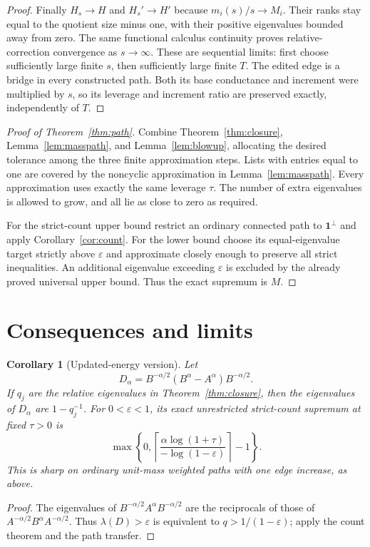 \documentclass[11pt]{article}
\newtheorem{corollary}[theorem]{Corollary}
\begin{document}
\begin{proof}
Finally $H_s\to H$ and $H_s'\to H'$ because $m_i(s)/s\to M_i$.
Their ranks stay equal to the quotient size minus one, with their
positive eigenvalues bounded away from zero. The same functional
calculus continuity proves relative-correction convergence as
$s\to\infty$. These are sequential limits: first choose sufficiently
large finite $s$, then sufficiently large finite $T$.
The edited edge is a bridge in every constructed path. Both its base
conductance and increment were multiplied by $s$, so its leverage
and increment ratio are preserved exactly, independently of $T$.
\end{proof}

\begin{proof}[Proof of Theorem~\ref{thm:path}]
Combine Theorem~\ref{thm:closure}, Lemma~\ref{lem:masspath}, and
Lemma~\ref{lem:blowup}, allocating the desired tolerance among the
three finite approximation steps. Lists with entries equal to one
are covered by the noncyclic approximation in
Lemma~\ref{lem:masspath}. Every approximation uses exactly the same
leverage $\tau$. The number of extra eigenvalues is allowed to grow,
and all lie as close to zero as required.

For the strict-count upper bound restrict an ordinary connected path
to $\mathbf1^\perp$ and apply Corollary~\ref{cor:count}.
For the lower bound choose its equal-eigenvalue target strictly above
$\varepsilon$ and approximate closely enough to preserve all strict
inequalities. An additional eigenvalue exceeding $\varepsilon$ is
excluded by the already proved universal upper bound. Thus the exact
supremum is $M$.
\end{proof}

\section{Consequences and limits}
\begin{corollary}[Updated-energy version]\label{cor:updated}
Let
\[
 D_\alpha=B^{-\alpha/2}(B^\alpha-A^\alpha)B^{-\alpha/2}.
\]
If $q_j$ are the relative eigenvalues in Theorem~\ref{thm:closure},
then the eigenvalues of $D_\alpha$ are $1-q_j^{-1}$.
For $0<\varepsilon<1$, its exact unrestricted strict-count supremum
at fixed $\tau>0$ is
\[
 \max\left\{0,\left\lceil
       \frac{\alpha\log(1+\tau)}{-\log(1-\varepsilon)}
                              \right\rceil-1\right\}.
\]
This is sharp on ordinary unit-mass weighted paths with one edge
increase, as above.
\end{corollary}
\begin{proof}
The eigenvalues of $B^{-\alpha/2}A^\alpha B^{-\alpha/2}$ are the
reciprocals of those of $A^{-\alpha/2}B^\alpha A^{-\alpha/2}$.
Thus $\lambda(D)>\varepsilon$ is equivalent to
$q>1/(1-\varepsilon)$; apply the count theorem and the path transfer.
\end{proof}
\end{document}
